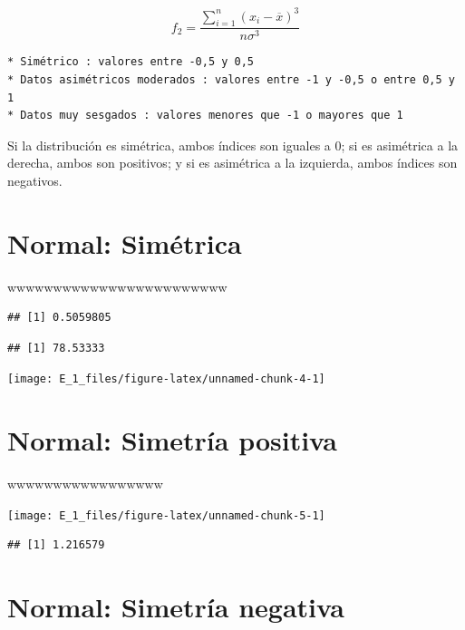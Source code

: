 \documentclass[
  11pt,
]{krantz}
\theoremstyle{definition}
\theoremstyle{definition}
\theoremstyle{definition}
\theoremstyle{definition}
\theoremstyle{remark}
\begin{document}
\[
f_2=\frac{\sum_{i=1}^{n}\left( x_i-\overline{x}\right)^3}{n\sigma^3}
\]

\begin{verbatim}
* Simétrico : valores entre -0,5 y 0,5
* Datos asimétricos moderados : valores entre -1 y -0,5 o entre 0,5 y 1
* Datos muy sesgados : valores menores que -1 o mayores que 1
\end{verbatim}

Si la distribución es simétrica, ambos índices son iguales a 0; si es asimétrica a la derecha, ambos son positivos; y si es asimétrica a la izquierda, ambos índices son negativos.

\hypertarget{normal-simuxe9trica}{%
\section{Normal: Simétrica}\label{normal-simuxe9trica}}

wwwwwwwwwwwwwwwwwwwwwwww

\begin{verbatim}
## [1] 0.5059805
\end{verbatim}

\begin{verbatim}
## [1] 78.53333
\end{verbatim}

\begin{center}\texttt{[image: E\_1\_files/figure-latex/unnamed-chunk-4-1]} \end{center}

\hypertarget{normal-simetruxeda-positiva}{%
\section{Normal: Simetría positiva}\label{normal-simetruxeda-positiva}}

wwwwwwwwwwwwwwwww

\begin{center}\texttt{[image: E\_1\_files/figure-latex/unnamed-chunk-5-1]} \end{center}

\begin{verbatim}
## [1] 1.216579
\end{verbatim}

\hypertarget{normal-simetruxeda-negativa}{%
\section{Normal: Simetría negativa}\label{normal-simetruxeda-negativa}}
\end{document}

